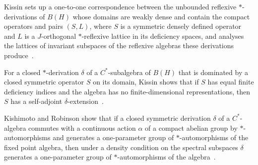 Kissin sets up a one-to-one correspondence between the unbounded reflexive $*$-derivations of $B(H)$ whose domains are weakly dense and contain the compact operators and pairs $(S,L)$, where $S$ is a symmetric densely defined operator and $L$ is a $J$-orthogonal $*$-reflexive lattice in its deficiency spaces, and analyses the lattices of invariant subspaces of the reflexive algebras these derivations produce~\cite{WlReflexiveStarDerivationsAndLat2006}.

For a closed $*$-derivation $\delta$ of a $C^*$-subalgebra of $B(H)$ that is dominated by a closed symmetric operator $S$ on its domain, Kissin shows that if $S$ has equal finite deficiency indices and the algebra has no finite-dimensional representations, then $S$ has a self-adjoint $\delta$-extension~\cite{WlSymmetricOperatorExtensionsOfU1988}.

Kishimoto and Robinson show that if a closed symmetric derivation $\delta$ of a $C^*$-algebra commutes with a continuous action $\alpha$ of a compact abelian group by $*$-automorphisms and generates a one-parameter group of $*$-automorphisms of the fixed point algebra, then under a density condition on the spectral subspaces $\delta$ generates a one-parameter group of $*$-automorphisms of the algebra~\cite{WlOnUnboundedDerivationsCommutin1982}.
